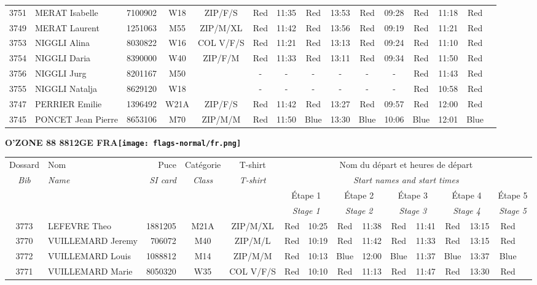 \documentclass{report}
\begin{document}
\begin{longtable}{|c|l|r|c|c|*{5}{cc|}}
    3751 & MERAT Isabelle & 7100902 & W18 & ZIP/F/S & Red & 11:35 & Red & 13:53 & Red & 09:28 & Red & 11:18 & Red &  \\
    3749 & MERAT Laurent & 1251063 & M55 & ZIP/M/XL & Red & 11:42 & Red & 13:56 & Red & 09:19 & Red & 11:21 & Red &  \\
    3753 & NIGGLI Alina & 8030822 & W16 & COL V/F/S & Red & 11:21 & Red & 13:13 & Red & 09:24 & Red & 11:10 & Red &  \\
    3754 & NIGGLI Daria & 8390000 & W40 & ZIP/F/M & Red & 11:33 & Red & 13:11 & Red & 09:34 & Red & 11:50 & Red &  \\
    3756 & NIGGLI Jurg & 8201167 & M50 &   & - &  - & - &  - & - &  - & Red & 11:43 & Red &  \\
    3755 & NIGGLI Natalja & 8629120 & W18 &   & - &  - & - &  - & - &  - & Red & 10:58 & Red &  \\
    3747 & PERRIER Emilie & 1396492 & W21A & ZIP/F/S & Red & 11:42 & Red & 13:27 & Red & 09:57 & Red & 12:00 & Red &  \\
    3745 & PONCET Jean Pierre & 8653106 & M70 & ZIP/M/M & Red & 11:50 & Blue & 13:30 & Blue & 10:06 & Blue & 12:01 & Blue &  \\
  \end{longtable}
\newpage
  \Huge \centering \bfseries O'ZONE 88 8812GE FRA\normalfont \footnotesize \sffamily \hfill \texttt{[image: flags-normal/fr.png]} \newline 
  \begin{longtable}{|c|l|r|c|c|*{5}{cc|}}
    Dossard & Nom  & Puce    & Catégorie & T-shirt & \multicolumn{10}{c|}{Nom du départ et heures de départ} \\
    \itshape Bib     & \itshape Name & \itshape SI card & \itshape Class  & \itshape  T-shirt  & \multicolumn{10}{c|}{\itshape Start names and start times} \\
    \hline
    & & & & & \multicolumn{2}{c|}{Étape 1} & \multicolumn{2}{c|}{Étape 2} & \multicolumn{2}{c|}{Étape 3} & \multicolumn{2}{c|}{Étape 4} & \multicolumn{2}{c|}{Étape 5} \\
    & & & & & \multicolumn{2}{c|}{\itshape Stage 1} & \multicolumn{2}{c|}{\itshape Stage 2} & \multicolumn{2}{c|}{\itshape Stage 3} & \multicolumn{2}{c|}{\itshape Stage 4} & \multicolumn{2}{c|}{\itshape Stage 5} \\
    \hline
    3773 & LEFEVRE Theo & 1881205 & M21A & ZIP/M/XL & Red & 10:25 & Red & 11:38 & Red & 11:41 & Red & 13:15 & Red &  \\
    3770 & VUILLEMARD Jeremy & 706072 & M40 & ZIP/M/L & Red & 10:19 & Red & 11:42 & Red & 11:33 & Red & 13:15 & Red &  \\
    3772 & VUILLEMARD Louis & 1088812 & M14 & ZIP/M/M & Red & 10:13 & Blue & 12:00 & Blue & 11:37 & Blue & 13:37 & Blue &  \\
    3771 & VUILLEMARD Marie & 8050320 & W35 & COL V/F/S & Red & 10:10 & Red & 11:13 & Red & 11:47 & Red & 13:30 & Red &  \\
  \end{longtable}
\end{document}
